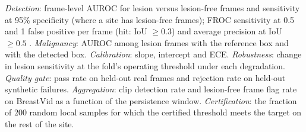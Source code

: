  \emph{Detection}: frame-level AUROC for lesion versus lesion-free frames and sensitivity at 95\% specificity (where a site has lesion-free frames); FROC sensitivity at 0.5 and 1 false positive per frame (hit: IoU $\ge 0.3$) and average precision at IoU $\ge 0.5$ \cite{voc}. \emph{Malignancy}: AUROC among lesion frames with the reference box and with the detected box. \emph{Calibration}: slope, intercept and ECE. \emph{Robustness}: change in lesion sensitivity at the fold's operating threshold under each degradation. \emph{Quality gate}: pass rate on held-out real frames and rejection rate on held-out synthetic failures. \emph{Aggregation}: clip detection rate and lesion-free frame flag rate on BreastVid as a function of the persistence window. \emph{Certification}: the fraction of 200 random local samples for which the certified threshold meets the target on the rest of the site.

